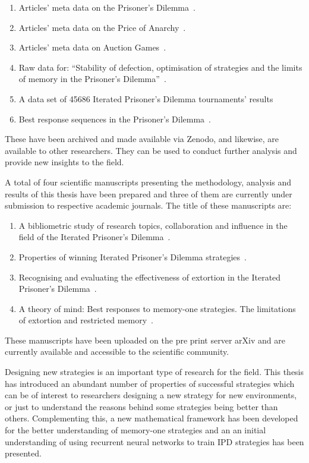 \begin{enumerate}
    \item Articles' meta data on the Prisoner's Dilemma~\cite{pd_data_2018}.
    \item Articles' meta data on the Price of Anarchy~\cite{anarchy_data_2018}.
    \item Articles' meta data on Auction Games~\cite{auction_data_2018}.
    \item Raw data for: ``Stability of defection, optimisation of strategies and
    the limits of memory in the Prisoner's Dilemma''~\cite{glynatsi2019}.
    \item A data set of 45686 Iterated Prisoner's Dilemma tournaments' results~\cite{Glynatsi2019_meta, Glynatsi2019_meta_raw_data}
    \item Best response sequences in the Prisoner's Dilemma~\cite{Glynatsi2020_sequences}.
\end{enumerate}

These have been archived and made available via Zenodo, and likewise, are
available to other researchers. They can be used to conduct further analysis and
provide new insights to the field.

A total of four scientific manuscripts presenting the methodology, analysis and
results of this thesis have been prepared and three of them are currently under
submission to respective academic journals. The title of these manuscripts are:

\begin{enumerate}
    \item A bibliometric study of research topics, collaboration and influence
    in the field of the Iterated Prisoner's Dilemma~\cite{Glynatsi2019_bibliometric}.
    \item Properties of winning Iterated Prisoner's Dilemma
    strategies~\cite{Glynatsi2020meta_article}.
    \item Recognising and evaluating the effectiveness of extortion in the
    Iterated Prisoner's Dilemma~\cite{Knight2019}.
    \item A theory of mind: Best responses to memory-one strategies.
    The limitations of extortion and restricted memory~\cite{Glynatsi2019theory}.
\end{enumerate}

These manuscripts have been uploaded on the pre
print server arXiv and are currently available and accessible to the scientific
community.

Designing new strategies is an important type of research for the field.
This thesis has introduced an abundant number of properties of successful
strategies which can be of interest to researchers designing a new strategy
for new environments, or just to understand the reasons behind some strategies
being better than others. Complementing this, a new mathematical framework has
been developed for the better understanding of memory-one strategies and an
an initial understanding of using recurrent neural networks to train IPD
strategies has been presented.


